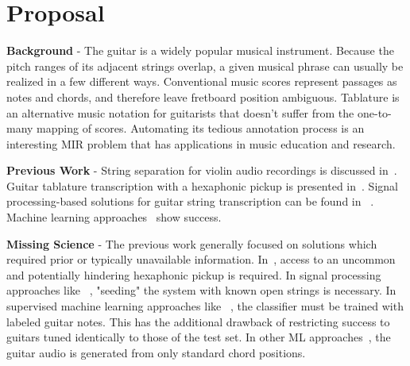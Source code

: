 \documentclass[12pt]{cmuthesis}
\begin{document}
\mainmatter


%
%
%
%
%
\chapter{Proposal}
\noindent
\textbf{Background} - The guitar is a widely popular musical instrument. Because the pitch ranges of its adjacent strings overlap, a given musical phrase can usually be realized in a few different ways. Conventional music scores represent passages as notes and chords, and therefore leave fretboard position ambiguous. Tablature is an alternative music notation for guitarists that doesn't suffer from the one-to-many mapping of scores. Automating its tedious annotation process is an interesting MIR problem that has applications in music education and research.

\noindent
\textbf{Previous Work} - String separation for violin audio recordings is discussed in~\cite{maezawa2009}. Guitar tablature transcription with a hexaphonic pickup is presented in~\cite{ogrady2009}. Signal processing-based solutions for guitar string transcription can be found in ~\cite{barbanchoa2012,barbanchoi2012}. Machine learning approaches~\cite{barbancho2009, abesser2012, kehling2014} show success.

\noindent
\textbf{Missing Science} - The previous work generally focused on solutions which required prior or typically unavailable information. In~\cite{ogrady2009}, access to an uncommon and potentially hindering hexaphonic pickup is required. In signal processing approaches like ~\cite{barbanchoi2012}, "seeding" the system with known open strings is necessary. In supervised machine learning approaches like ~\cite{abesser2012, kehling2014}, the classifier must be trained with labeled guitar notes. This has the additional drawback of restricting success to guitars tuned identically to those of the test set. In other ML approaches~\cite{barbancho2009}, the guitar audio is generated from only standard chord positions. 
\end{document}
